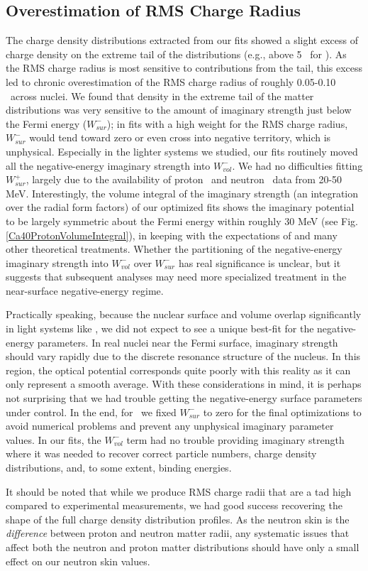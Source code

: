 \subsection{Overestimation of RMS Charge Radius}
The charge density distributions extracted from our fits showed a slight
excess of charge density on the extreme tail of the distributions (e.g., above 5 
\femto\meter\ for \caForty). As the RMS charge radius is most sensitive to
contributions from the tail, this excess led to chronic overestimation of the RMS
charge radius of roughly 0.05-0.10 \femto\meter\ across nuclei.
We found that density in the extreme tail of the matter distributions was very
sensitive to the amount of imaginary strength just below the Fermi energy
($W_{sur}^{-}$); in fits with a high weight for the RMS charge radius,
$W_{sur}^{-}$ would tend toward zero or even cross into negative territory,
which is unphysical. Especially in the lighter systems we studied, our fits routinely
moved all the negative-energy imaginary strength into $W_{vol}^{-}$.
We had no difficulties fitting $W_{sur}^{+}$, largely due to the
availability of proton \rxn\ and neutron \tot\ data from 20-50 MeV.
Interestingly, the volume
integral of the imaginary strength (an integration over the
radial form factors) of our optimized fits shows the imaginary potential to be largely symmetric
about the Fermi energy within roughly 30 MeV (see Fig. \ref{Ca40ProtonVolumeIntegral}),
in keeping with the expectations of \cite{Mahaux1991} and many other theoretical
treatments. Whether the partitioning
of the negative-energy imaginary strength into $W_{vol}^{-}$ over $W_{sur}^{-}$
has real significance is unclear, but it suggests that subsequent 
analyses may need more specialized treatment in the near-surface negative-energy
regime.

Practically speaking, because the nuclear surface and volume overlap
significantly in light systems like \oSix, we did not expect to see a unique best-fit for the
negative-energy parameters. In real nuclei near the Fermi surface,
imaginary strength should vary rapidly due to the discrete resonance structure of
the nucleus. In this region, the optical potential corresponds quite poorly
with this reality as it can only represent a smooth average. With these
considerations in mind, it is perhaps
not surprising that we had trouble getting
the negative-energy surface parameters under control. In the end, for
\oSixEight\ we fixed $W_{sur}^{-}$ to zero for
the final optimizations to avoid numerical problems and prevent any
unphysical imaginary parameter values. In our fits, the
$W_{vol}^{-}$ term had no trouble providing imaginary strength where it was
needed to recover correct particle numbers, charge density distributions, and,
to some extent, binding energies.

It should be noted that while we produce RMS charge radii that are a tad high
compared to experimental measurements, we had good success recovering the shape
of the full charge density distribution profiles. As the neutron skin is the
\textit{difference} between proton and neutron matter radii, any systematic
issues that affect both the neutron and proton matter distributions should have
only a small effect on our neutron skin values.
\afterpage{\clearpage}
